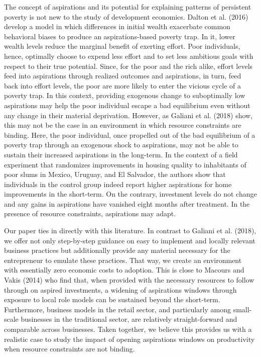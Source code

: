 \documentclass[11.5pt]{article}
\begin{document}
The concept of aspirations and its potential for explaining patterns of persistent poverty is not new to the study of development economics. Dalton et al. (2016) develop a model in which differences in initial wealth exacerbate common behavioral biases to produce an aspirations-based poverty trap. In it, lower wealth levels reduce the marginal benefit of exerting effort. Poor individuals, hence, optimally choose to expend less effort and to set less ambitious goals with respect to their true potential. Since, for the poor and the rich alike, effort levels feed into aspirations through realized outcomes and aspirations, in turn, feed back into effort levels, the poor are more likely to enter the vicious cycle of a poverty trap. In this context, providing exogenous change to suboptimally low aspirations may help the poor individual escape a bad equilibrium even without any change in their material deprivation. However, as Galiani et al. (2018) show, this may not be the case in an environment in which resource constraints are binding. Here, the poor individual, once propelled out of the bad equilibrium of a poverty trap through an exogenous shock to aspirations, may not be able to sustain their increased aspirations in the long-term. In the context of a field experiment that randomizes improvements in housing quality to inhabitants of poor slums in Mexico, Uruguay, and El Salvador, the authors show that individuals in the control group indeed report higher aspirations for home improvements in the short-term. On the contrary, investment levels do not change and any gains in aspirations have vanished eight months after treatment. In the presence of resource constraints, aspirations may adapt.

Our paper ties in directly with this literature. In contrast to Galiani et al. (2018), we offer not only step-by-step guidance on easy to implement and locally relevant business practices but additionally provide any material necessary for the entrepreneur to emulate these practices. That way, we create an environment with essentially zero economic costs to adoption. This is close to Macours and Vakis (2014) who find that, when provided with the necessary resources to follow through on aspired investments, a widening of aspirations windows through exposure to local role models can be sustained beyond the short-term. Furthermore, business models in the retail sector, and particularly among small-scale businesses in the traditional sector, are relatively straight-forward and comparable across businesses. Taken together, we believe this provides us with a realistic case to study the impact of opening aspirations windows on productivity when resource constraints are not binding.
\end{document}

